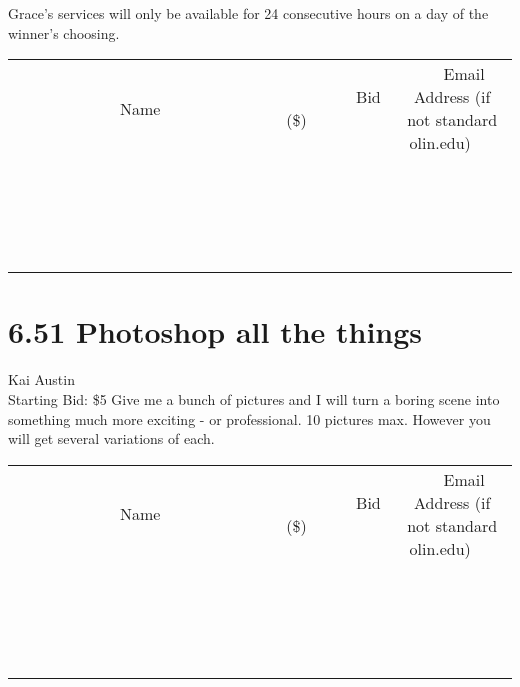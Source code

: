 \documentclass[11pt]{article}
\begin{document}
Grace's services will only be available for 24 consecutive hours on a day of the winner's choosing.
\\[3ex]
\begin{tabular}{c c c}
~~~~~~~~~~~~~Name~~~~~~~~~~~~~ & ~~~~~~~~~Bid (\$)~~~~~~~~~  & ~~~Email Address (if not standard olin.edu)~~~\\
 & & \\
\hline
 & & \\
\hline
 & & \\
\hline
 & & \\
\hline
 & & \\
\hline
 & & \\
\hline
 & & \\
\hline
 & & \\
\hline
 & & \\
\hline
 & & \\
\hline
 & & \\
\hline
 & & \\
\hline
 & & \\
\hline
 & & \\
\hline
 & & \\
\hline
 & & \\
\hline
 & & \\
\hline
 & & \\
\hline
 & & \\
\hline
\end{tabular}
\newpage
\section*{6.51 Photoshop all the things}
Kai Austin
\\
Starting Bid: \$5
\newline
Give me a bunch of pictures and I will turn a boring scene into something much more exciting - or professional. 
10 pictures max. However you will get several variations of each.
\\[3ex]
\begin{tabular}{c c c}
~~~~~~~~~~~~~Name~~~~~~~~~~~~~ & ~~~~~~~~~Bid (\$)~~~~~~~~~  & ~~~Email Address (if not standard olin.edu)~~~\\
 & & \\
\hline
 & & \\
\hline
 & & \\
\hline
 & & \\
\hline
 & & \\
\hline
 & & \\
\hline
 & & \\
\hline
 & & \\
\hline
 & & \\
\hline
 & & \\
\hline
 & & \\
\hline
 & & \\
\hline
 & & \\
\hline
 & & \\
\hline
 & & \\
\hline
 & & \\
\hline
 & & \\
\hline
 & & \\
\hline
 & & \\
\hline
\end{tabular}
\newpage
\end{document}
